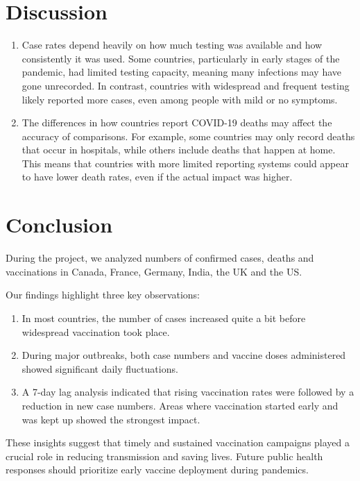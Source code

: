 \documentclass[
  11pt,
]{article}
\begin{document}
\section{Discussion}\label{sec-discussion}

\begin{enumerate}
\def\labelenumi{\arabic{enumi}.}
\item
  Case rates depend heavily on how much testing was available and how
  consistently it was used. Some countries, particularly in early stages
  of the pandemic, had limited testing capacity, meaning many infections
  may have gone unrecorded. In contrast, countries with widespread and
  frequent testing likely reported more cases, even among people with
  mild or no symptoms.
\item
  The differences in how countries report COVID-19 deaths may affect the
  accuracy of comparisons. For example, some countries may only record
  deaths that occur in hospitals, while others include deaths that
  happen at home. This means that countries with more limited reporting
  systems could appear to have lower death rates, even if the actual
  impact was higher.
\end{enumerate}

\section{Conclusion}\label{sec-conclusion}

During the project, we analyzed numbers of confirmed cases, deaths and
vaccinations in Canada, France, Germany, India, the UK and the US.

Our findings highlight three key observations:

\begin{enumerate}
\def\labelenumi{\arabic{enumi}.}
\item
  In most countries, the number of cases increased quite a bit before
  widespread vaccination took place.
\item
  During major outbreaks, both case numbers and vaccine doses
  administered showed significant daily fluctuations.
\item
  A 7-day lag analysis indicated that rising vaccination rates were
  followed by a reduction in new case numbers. Areas where vaccination
  started early and was kept up showed the strongest impact.
\end{enumerate}

These insights suggest that timely and sustained vaccination campaigns
played a crucial role in reducing transmission and saving lives. Future
public health responses should prioritize early vaccine deployment
during pandemics.
\end{document}
